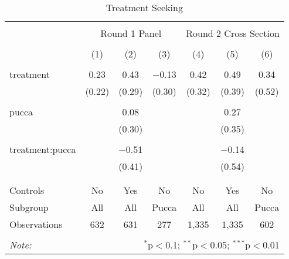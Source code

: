 
\begin{table}[!htbp] \centering 
  \caption{Treatment Seeking} 
  \label{tbl:Treatment Seeking} 
\begin{tabular}{@{\extracolsep{5pt}}lcccccc} 
\\[-1.8ex]\hline 
\hline \\[-1.8ex] 
 & \multicolumn{3}{c}{Round 1 Panel} & \multicolumn{3}{c}{Round 2 Cross Section} \\ 
\\[-1.8ex] & (1) & (2) & (3) & (4) & (5) & (6)\\ 
\hline \\[-1.8ex] 
 treatment & 0.23 & 0.43 & $-$0.13 & 0.42 & 0.49 & 0.34 \\ 
  & (0.22) & (0.29) & (0.30) & (0.32) & (0.39) & (0.52) \\ 
  & & & & & & \\ 
 pucca &  & 0.08 &  &  & 0.27 &  \\ 
  &  & (0.30) &  &  & (0.35) &  \\ 
  & & & & & & \\ 
 treatment:pucca &  & $-$0.51 &  &  & $-$0.14 &  \\ 
  &  & (0.41) &  &  & (0.54) &  \\ 
  & & & & & & \\ 
\hline \\[-1.8ex] 
Controls & No & Yes & No & No & Yes & No \\ 
Subgroup & All & All & Pucca & All & All & Pucca \\ 
Observations & 632 & 631 & 277 & 1,335 & 1,335 & 602 \\ 
\hline 
\hline \\[-1.8ex] 
\textit{Note:}  & \multicolumn{6}{r}{$^{*}$p$<$0.1; $^{**}$p$<$0.05; $^{***}$p$<$0.01} \\ 
\end{tabular} 
\end{table} 
